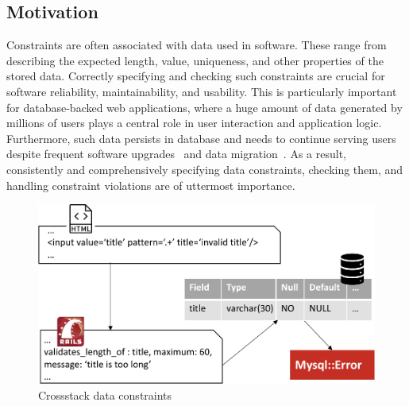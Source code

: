 \label{sec:intro}


\subsection{Motivation}
Constraints are often associated with data used in software. These range from describing the expected length, value, uniqueness, and other properties of the stored data. Correctly specifying and checking such
constraints are crucial for software reliability, maintainability, and
usability. This is particularly important for 
database-backed web applications, where a huge amount of data generated by millions of users plays a central role
in user interaction and application logic. Furthermore, such data persists
in database and needs to continue serving users despite
frequent software upgrades~\cite{gitlab-release} 
and data migration~\cite{gitlab-migrate}. As a result, consistently and comprehensively specifying data constraints, checking them, and handling constraint violations are of uttermost importance.

 
\begin{figure}
    \centering
    \includegraphics[width=0.6\columnwidth]{constraints/figs/problem2.pdf}
    \caption{Crossstack data constraints}
    \label{fig:crossstack}
\end{figure}

